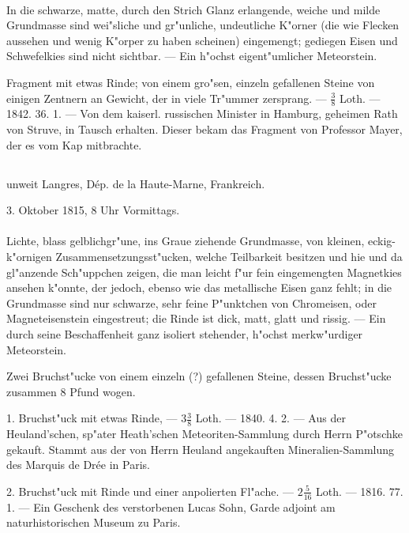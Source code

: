 \documentclass[a4paper, 11pt, oneside, polutonikogreek, german]{article}
\begin{document}
\paragraph{}
In die schwarze, matte, durch den Strich Glanz erlangende, weiche und milde Grundmasse sind wei"sliche und gr"unliche, undeutliche K"orner (die wie Flecken aussehen und wenig K"orper zu haben scheinen) eingemengt; gediegen Eisen und Schwefelkies sind nicht sichtbar. --- Ein h"ochst eigent"umlicher Meteorstein.

Fragment mit etwas Rinde; von einem gro"sen, einzeln gefallenen Steine von einigen Zentnern an Gewicht, der in viele Tr"ummer zersprang. --- $\mathfrak{\frac{3}{8}}$ Loth. --- 1842. 36. 1. --- Von dem kaiserl. russischen Minister in Hamburg, geheimen Rath von Struve, in Tausch erhalten. Dieser bekam das Fragment von Professor Mayer, der es vom Kap mitbrachte.
\subsection[\swabfamily {Chassigny.}]{}
\begin{center}
unweit Langres, Dép. de la Haute-Marne, Frankreich.

3. Oktober 1815, 8 Uhr Vormittags.
\end{center}
\paragraph{}
Lichte, blass gelblichgr"une, ins Graue ziehende Grundmasse, von kleinen, eckig-k"ornigen Zusammensetzungsst"ucken, welche Teilbarkeit besitzen und hie und da gl"anzende Sch"uppchen zeigen, die man leicht f"ur fein eingemengten Magnetkies ansehen k"onnte, der jedoch, ebenso wie das metallische Eisen ganz fehlt; in die Grundmasse sind nur schwarze, sehr feine P"unktchen von Chromeisen, oder Magneteisenstein eingestreut; die Rinde ist dick, matt, glatt und rissig. --- Ein durch seine Beschaffenheit ganz isoliert stehender, h"ochst merkw"urdiger Meteorstein.

Zwei Bruchst"ucke von einem einzeln (?) gefallenen Steine, dessen Bruchst"ucke zusammen 8 Pfund wogen.

1. Bruchst"uck mit etwas Rinde, --- $\mathfrak{3\frac{3}{8}}$ Loth. --- 1840. 4. 2. --- Aus der Heuland’schen, sp"ater Heath’schen Meteoriten-Sammlung durch Herrn P"otschke gekauft. Stammt aus der von Herrn Heuland angekauften Mineralien-Sammlung des Marquis de Drée in Paris.

2. Bruchst"uck mit Rinde und einer anpolierten Fl"ache. --- $\mathfrak{2\frac{5}{16}}$ Loth. --- 1816. 77. 1. --- Ein Geschenk des verstorbenen Lucas Sohn, Garde adjoint am naturhistorischen Museum zu Paris.
\end{document}
